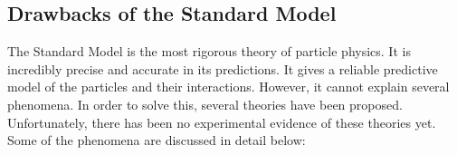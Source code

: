 \subsection{Drawbacks of the Standard Model}%
\label{sec:theory:standardmodel:drawbacks}
The Standard Model is the most rigorous theory of particle physics. It is incredibly precise and accurate in its predictions. It gives a reliable predictive model of the particles and their interactions. However, it cannot explain several phenomena. In order to solve this, several theories have been proposed. Unfortunately, there has been no experimental evidence of these theories yet. Some of the phenomena are discussed in detail below:

